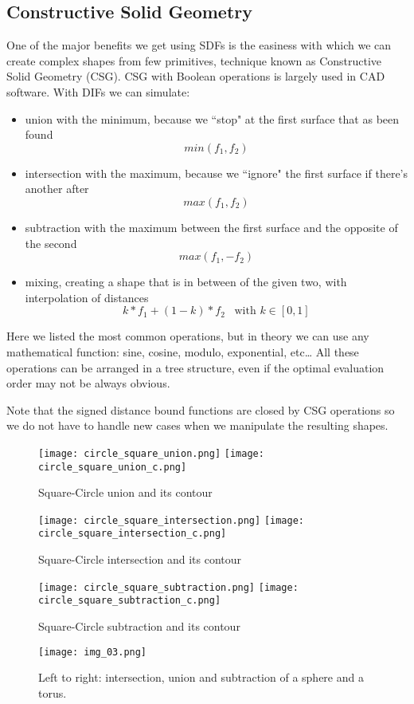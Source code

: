 \subsection{Constructive Solid Geometry}
One of the major benefits we get using SDFs is the easiness with which we can create complex shapes from few primitives, technique known as Constructive Solid Geometry (CSG).
CSG with Boolean operations is largely used in CAD software.
With DIFs we can simulate:
\begin{itemize}
  \item union with the minimum, because we ``stop" at the first surface that as been found
    $$ min(f_1, f_2) $$
  \item intersection with the maximum, because we ``ignore" the first surface if there's another after
    $$ max(f_1, f_2) $$
  \item subtraction with the maximum between the first surface and the opposite of the second
    $$ max(f_1, -f_2) $$

  \item mixing, creating a shape that is in between of the given two, with interpolation of distances
    $$ k*f_1 + (1-k) * f_2 \;\;\; \text{with $k\in[0,1]$} $$
\end{itemize}
Here we listed the most common operations, but in theory we can use any mathematical function: sine, cosine, modulo, exponential, etc\dots
All these operations can be arranged in a tree structure, even if the optimal evaluation order may not be always obvious.


Note that the signed distance bound functions are closed by CSG operations so we do not have to handle new cases when we manipulate the resulting shapes.

\begin{figure}[!htb]
  \texttt{[image: circle\_square\_union.png]}
  \texttt{[image: circle\_square\_union\_c.png]}
  \caption{Square-Circle union and its contour}\label{fig:union}
\endminipage\hfill
{}
  \texttt{[image: circle\_square\_intersection.png]}
  \texttt{[image: circle\_square\_intersection\_c.png]}
  \caption{Square-Circle intersection and its contour}
  \label{fig:intersection}
\endminipage\hfill
{}%
  \texttt{[image: circle\_square\_subtraction.png]}
  \texttt{[image: circle\_square\_subtraction\_c.png]}
  \caption{Square-Circle subtraction and its contour}
  \label{fig:subtraction}
\endminipage
\end{figure}
\begin{figure}[!htb]
  \centering
  \texttt{[image: img\_03.png]}
  \caption{Left to right:
    intersection, union and subtraction of a sphere and a torus.
  }
  \label{fig:csg}
\end{figure}

